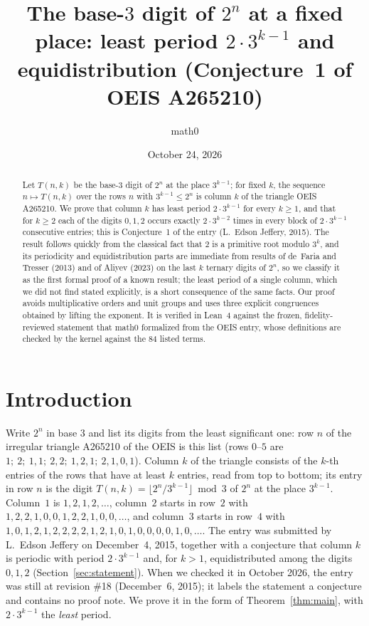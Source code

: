 \documentclass[11pt]{amsart}
\title[Columns of the ternary digits of $2^n$]{The base-$3$ digit of $2^n$ at a fixed place: least period $2\cdot3^{k-1}$ and equidistribution (Conjecture~1 of OEIS A265210)}
\author{math0}
\date{October 24, 2026}
\theoremstyle{plain}
\theoremstyle{definition}
\begin{document}
\begin{abstract}
Let $T(n,k)$ be the base-$3$ digit of $2^n$ at the place $3^{k-1}$; for fixed $k$, the sequence $n\mapsto T(n,k)$ over the rows $n$ with $3^{k-1}\le 2^n$ is column $k$ of the triangle OEIS A265210.
We prove that column $k$ has least period $2\cdot3^{k-1}$ for every $k\ge1$, and that for $k\ge2$ each of the digits $0,1,2$ occurs exactly $2\cdot3^{k-2}$ times in every block of $2\cdot3^{k-1}$ consecutive entries; this is Conjecture~1 of the entry (L.~Edson Jeffery, 2015).
The result follows quickly from the classical fact that $2$ is a primitive root modulo $3^k$, and its periodicity and equidistribution parts are immediate from results of de~Faria and Tresser (2013) and of Aliyev (2023) on the last $k$ ternary digits of $2^n$, so we classify it as the first formal proof of a known result; the least period of a single column, which we did not find stated explicitly, is a short consequence of the same facts.
Our proof avoids multiplicative orders and unit groups and uses three explicit congruences obtained by lifting the exponent.
It is verified in Lean~4 against the frozen, fidelity-reviewed statement that math0 formalized from the OEIS entry, whose definitions are checked by the kernel against the $84$ listed terms.
\end{abstract}
\maketitle

\section{Introduction}

Write $2^n$ in base $3$ and list its digits from the least significant one: row $n$ of the irregular triangle A265210 of the OEIS \cite{A265210} is this list (rows $0$--$5$ are $1;\ 2;\ 1,1;\ 2,2;\ 1,2,1;\ 2,1,0,1$). Column $k$ of the triangle consists of the $k$-th entries of the rows that have at least $k$ entries, read from top to bottom; its entry in row $n$ is the digit $T(n,k)=\lfloor 2^n/3^{k-1}\rfloor \bmod 3$ of $2^n$ at the place $3^{k-1}$. Column~$1$ is $1,2,1,2,\dots$, column~$2$ starts in row~$2$ with $1,2,2,1,0,0,1,2,2,1,0,0,\dots$, and column~$3$ starts in row~$4$ with $1,0,1,2,1,2,2,2,2,1,2,1,0,1,0,0,0,0,1,0,\dots$.
The entry was submitted by L.~Edson Jeffery on December~4, 2015, together with a conjecture that column $k$ is periodic with period $2\cdot3^{k-1}$ and, for $k>1$, equidistributed among the digits $0,1,2$ (Section~\ref{sec:statement}). When we checked it in October 2026, the entry was still at revision \#18 (December~6, 2015); it labels the statement a conjecture and contains no proof note. We prove it in the form of Theorem~\ref{thm:main}, with $2\cdot3^{k-1}$ the \emph{least} period.
\end{document}
